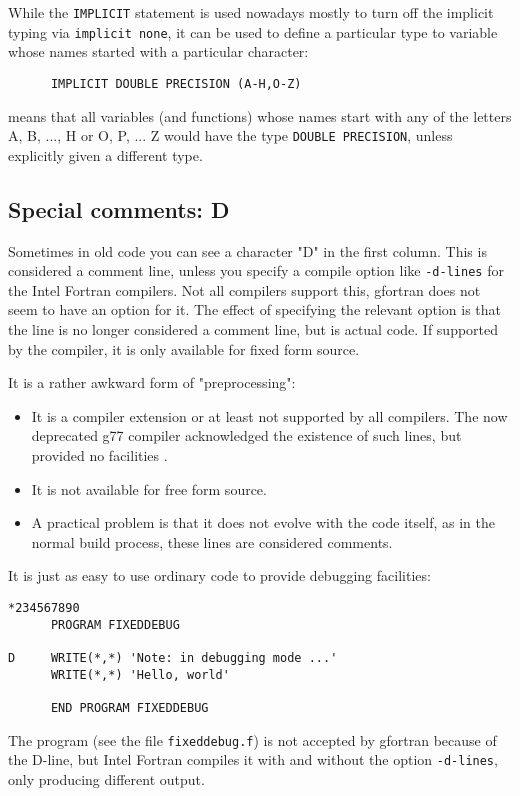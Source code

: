 While the \verb+IMPLICIT+ statement is used nowadays mostly to turn off the implicit typing via \verb+implicit none+,
it can be used to define a particular type to variable whose names started with a particular character:
\begin{verbatim}
      IMPLICIT DOUBLE PRECISION (A-H,O-Z)
\end{verbatim}

\noindent means that all variables (and functions) whose names start with any of the letters A, B, ..., H or
O, P, ... Z would have the type \verb+DOUBLE PRECISION+, unless explicitly given a different type.

\subsection{Special comments: D}
Sometimes in old code you can see a character "D" in the first column. This is considered a comment line,
unless you specify a compile option like \verb+-d-lines+ for the Intel Fortran compilers. Not all compilers
support this, gfortran does not seem to have an option for it. The effect of specifying the relevant
option is that the line is no longer considered a comment line, but is actual code. If supported by the compiler,
it is only available for fixed form source.

It is a rather awkward form of "preprocessing":
\begin{itemize}
\item
It is a compiler extension or at least not supported by all compilers. The now deprecated g77 compiler acknowledged
the existence of such lines, but provided no facilities \cite{F77DLine}.
\item
It is not available for free form source.
\item
A practical problem is that it does not evolve with the code itself, as in the normal build process, these
lines are considered comments.
\end{itemize}

It is just as easy to use ordinary code to provide debugging facilities:
\begin{verbatim}
*234567890
      PROGRAM FIXEDDEBUG

D     WRITE(*,*) 'Note: in debugging mode ...'
      WRITE(*,*) 'Hello, world'

      END PROGRAM FIXEDDEBUG
\end{verbatim}

The program (see the file \verb+fixeddebug.f+) is not accepted by gfortran because of the D-line, but Intel Fortran
compiles it with and without the option \verb+-d-lines+, only producing different output.

